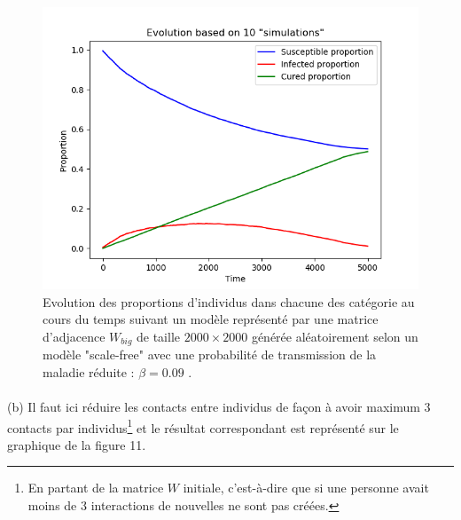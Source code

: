 \documentclass[a4paper, 12pt, oneside]{article}
\begin{document}
\begin{figure}[H]
	\centering
	\includegraphics[scale=1]{Wbig_dense_reduction_transmission_comparaison.png} 
	\caption{Evolution des proportions d'individus dans chacune des catégorie au cours du temps suivant un modèle représenté par une matrice d'adjacence $W_{big}$ de taille $2000 \times 2000$ générée aléatoirement selon un modèle "scale-free" avec une probabilité de transmission de la maladie réduite : $\beta = 0.09$ .}
\end{figure}

\paragraph{}(b) Il faut ici réduire les contacts entre individus de façon à avoir maximum 3 contacts par individus\footnote{En partant de la matrice $W$ initiale, c'est-à-dire que si une personne avait moins de 3 interactions de nouvelles ne sont pas créées.} et le résultat correspondant est représenté sur le graphique de la figure 11.
\end{document}
